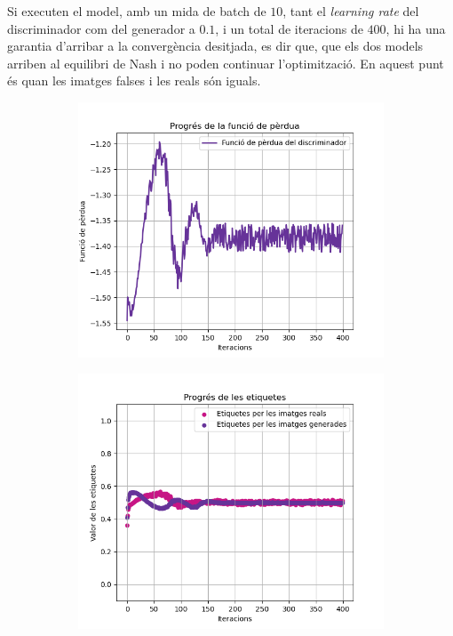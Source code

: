 Si executen el model, amb un mida de batch de $10$, tant el \textit{learning rate} del discriminador com del generador a $0.1$, i un total de iteracions de $400$, hi ha una garantia d'arribar a la convergència desitjada, es dir que, que els dos models arriben al equilibri de Nash i no poden continuar l'optimització. En aquest punt és quan les imatges falses i les reals són iguals.
\begin{figure}[H]
	\label{fig:labels_loss_400}
	\begin{subfigure}{0.45\textwidth}
		\includegraphics[width=\linewidth]{figures/model/loss_plot.png}
		\caption{}
		\label{fig:loss_400}
	\end{subfigure}
	\begin{subfigure}{0.45\textwidth}
		\includegraphics[width=\linewidth]{figures/model/labels_plot.png}

\end{subfigure}
\end{figure}
